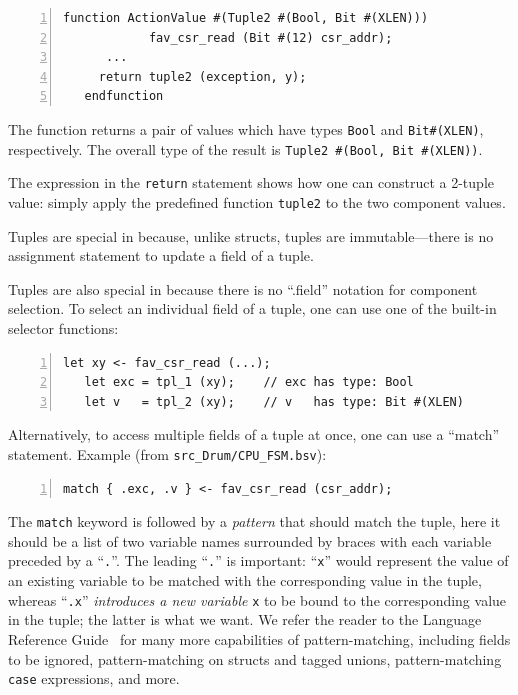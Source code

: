 {\footnotesize
\begin{Verbatim}[frame=single, numbers=left, label=in src\_Common/CSRs.bsv]
   function ActionValue #(Tuple2 #(Bool, Bit #(XLEN)))
            fav_csr_read (Bit #(12) csr_addr);
      ...
	 return tuple2 (exception, y);
   endfunction
\end{Verbatim}
}

The function returns a pair of values which have types \verb|Bool| and
\verb|Bit#(XLEN)|, respectively.  The overall type of the result is
\verb|Tuple2 #(Bool, Bit #(XLEN))|.

The expression in the \verb|return| statement shows how one can
construct a 2-tuple value: simply apply the predefined function
\verb|tuple2| to the two component values.

Tuples are special in {\BSV} because, unlike structs, tuples are
immutable---there is no assignment statement to update a field of a
tuple.

Tuples are also special in {\BSV} because there is no ``.field''
notation for component selection.  To select an individual field of a
tuple, one can use one of the built-in selector functions:

{\footnotesize
\begin{Verbatim}[frame=single, numbers=left]
   let xy <- fav_csr_read (...);
   let exc = tpl_1 (xy);    // exc has type: Bool
   let v   = tpl_2 (xy);    // v   has type: Bit #(XLEN)
\end{Verbatim}
}

Alternatively, to access multiple fields of a tuple at once, one can
use a ``match'' statement. Example (from \verb|src_Drum/CPU_FSM.bsv|):


{\footnotesize
\begin{Verbatim}[frame=single, numbers=left]
   match { .exc, .v } <- fav_csr_read (csr_addr);
\end{Verbatim}
}

The \verb|match| keyword is followed by a \emph{pattern} that should
match the tuple, {\ie} here it should be a list of two variable names
surrounded by braces with each variable preceded by a ``\verb|.|''.
The leading ``\verb|.|'' is important: ``\verb|x|'' would represent
the value of an existing variable to be matched with the corresponding
value in the tuple, whereas ``\verb|.x|'' \emph{introduces a new
variable} \verb|x| to be bound to the corresponding value in the
tuple; the latter is what we want.  We refer the reader to the {\BSV}
Language Reference Guide~\cite{BSV_Lang_Ref_Guide} for many more
capabilities of pattern-matching, including fields to be ignored,
pattern-matching on structs and tagged unions, pattern-matching
\verb|case| expressions, and more.


